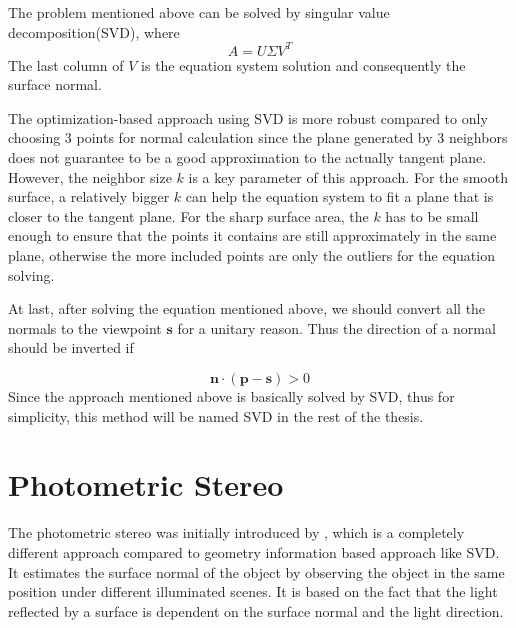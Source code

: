The problem mentioned above can be solved by singular value decomposition(SVD), where
\[ A=U\Sigma V^T \]
The last column of $ V $ is the equation system solution and consequently the surface normal. 

The optimization-based approach using SVD is more robust compared to only choosing 3 points for normal calculation since the plane generated by 3 neighbors does not guarantee to be a good approximation to the actually tangent plane. However, the neighbor size $ k $ is a key parameter of this approach. For the smooth surface, a relatively bigger $ k $ can help the equation system to fit a plane that is closer to the tangent plane. For the sharp surface area, the $ k $ has to be small enough to ensure that the points it contains are still approximately in the same plane, otherwise the more included points are only the outliers for the equation solving. 

At last, after solving the equation mentioned above, we should convert all the normals to the viewpoint $ \textbf{s} $ for a unitary reason. Thus the direction of a normal should be inverted if 

\begin{equation}\label{eq:normal-invertion}
	\textbf{n} \cdot (\textbf{p}  - \textbf{s}) > 0
\end{equation}
Since the approach mentioned above is basically solved by SVD, thus for simplicity, this method will be named SVD in the rest of the thesis.


\section{Photometric Stereo}
The photometric stereo was initially introduced by \cite{photometric-stereo}, which is a completely different approach compared to geometry information based approach like SVD. It estimates the surface normal of the object by observing the object in the same position under different illuminated scenes. It is based on the fact that the light reflected by a surface is dependent on the surface normal and the light direction.

